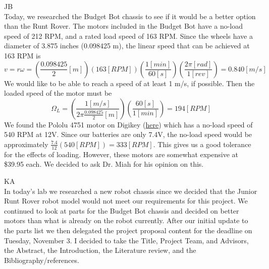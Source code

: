 \documentclass[fontsize=11pt, %
                             paper=letter, %
                             openany, %
                             captions=tableheading,
                             index=totoc,
                             hyperref]{labbook}
\begin{document}
\begin{addmargin}[0cm]{0cm}


JB\\
Today, we researched the Budget Bot chassis to see if it would be a better option than the Runt Rover. The motors included in the Budget Bot have a no-load speed of 212 RPM, and a rated load speed of 163 RPM. Since the wheels have a diameter of 3.875 inches (0.098425 m), the linear speed that can be achieved at 163 RPM is
$$v = r\omega = \left(\frac{0.098425}{2} [m]\right)\left(163 [RPM]\right)\left(\frac{1 [min]}{60 [s]}\right)\left(\frac{2\pi [rad]}{1 [rev]}\right) = 0.840 [m/s]$$
We would like to be able to reach a speed of at least 1 m/s, if possible. Then the loaded speed of the motor must be
$$\Omega_L = \left(\frac{1 [m/s]}{2\pi\frac{0.098425}{2} [m]}\right)\left(\frac{60 [s]}{1 [min]}\right) = 194 [RPM]$$
We found the Pololu 4751 motor on Digikey (\href{https://www.digikey.com/en/products/detail/pololu-corporation/4751/10450205}{here}) which has a no-load speed of 540 RPM at 12V. Since our batteries are only 7.4V, the no-load speed would be approximately $\frac{7.4}{12}(540 [RPM]) = 333 [RPM]$. This gives us a good tolerance for the effects of loading. However, these motors are somewhat expensive at \$39.95 each. We decided to ask Dr. Miah for his opinion on this.

\vspace*{12pt}
KA\\
In today's lab we researched a new robot chassis since we decided that the Junior Runt Rover robot model would not meet our requirements for this project. We continued to look at parts for the Budget Bot chassis and decided on better motors than what is already on the robot currently. After our initial update to the parts list we then delegated the project proposal content for the deadline on Tuesday, November 3. I decided to take the Title, Project Team, and Advisors, the Abstract, the Introduction, the Literature review, and the Bibliography/references.




\end{addmargin}
\end{document}
